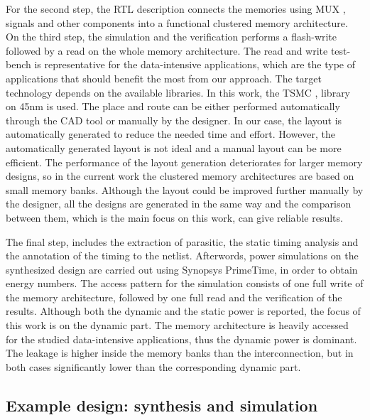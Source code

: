 For the second step, the RTL description connects the memories using MUX , signals and other components into a functional clustered memory architecture. 
On the third step, the simulation and the verification performs a flash-write followed by a read on the whole memory architecture. 
The read and write test-bench is representative for the data-intensive applications, which are the type of applications that should benefit the most from our approach. 
The target technology depends on the available libraries.
In this work, the TSMC , library on 45nm is used.
The place and route can be either performed automatically through the CAD tool or manually by the designer.
In our case, the layout is automatically generated to reduce the needed time and effort. 
However, the automatically generated layout is not ideal and a manual layout can be more efficient.
The performance of the layout generation deteriorates for larger memory designs, so in the current work the clustered memory architectures are based on small memory banks.
Although the layout could be improved further manually by the designer, all the designs are generated in the same way and the comparison between them, which is the main focus on this work, can give reliable results.


The final step, includes the extraction of  parasitic, the static timing analysis and the annotation of the timing to the netlist.
Afterwords, power simulations on the synthesized design are carried out using Synopsys PrimeTime, in order to obtain energy numbers.
The access pattern for the simulation consists of one full write of the memory architecture, followed by one full read and the verification of the results.
Although both the dynamic and the static power is reported, the focus of this work is on the dynamic part.
The memory architecture is heavily accessed for the studied data-intensive applications, thus the dynamic power is dominant.
The leakage is higher inside the memory banks than the interconnection, but in both cases significantly lower than the corresponding dynamic part.

\subsection{Example design: synthesis and simulation}

